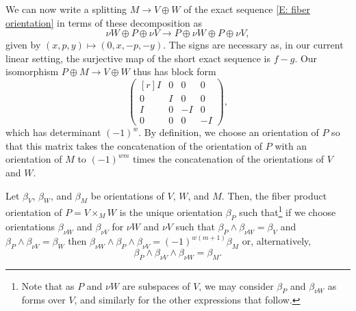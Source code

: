 We can now write a splitting $M \to V \oplus W$ of the exact sequence \eqref{E: fiber orientation} in terms of these decomposition as
$$\nu W \oplus P \oplus \nu V \to P \oplus \nu W \oplus P \oplus \nu V,$$
given by $(x,p,y) \mapsto (0, x, -p, -y)$.
The signs are necessary as, in our current linear setting, the surjective map of the short exact sequence is $f-g$.
Our isomorphism $P \oplus M \to V \oplus W$ thus has block form
$$\begin{pmatrix*}[r]
	I&0&0&0\\
	0&I&0&0\\
	I&0&-I&0\\
	0&0&0&-I
\end{pmatrix*},$$
which has determinant $(-1)^{w}$.
By definition, we choose an orientation of $P$ so that this matrix takes the concatenation of the orientation of $P$ with an orientation of $M$ to $(-1)^{wm}$ times the concatenation of the orientations of $V$ and $W$.

\begin{proposition}\label{P: orient intersection}
	Let $\beta_V$, $\beta_W$, and $\beta_M$ be orientations of $V$, $W$, and $M$.
	Then, the fiber product orientation of $P = V \times_M W$ is the unique orientation $\beta_P$ such that\footnote{Note that as $P$ and $\nu W$ are subspaces of $V$, we may consider $\beta_P$ and $\beta_{\nu W}$ as forms over $V$, and similarly for the other expressions that follow.} if we choose orientations $\beta_{\nu W}$ and $\beta_{\nu V}$ for $\nu W$ and $\nu V$ such that $\beta_P \wedge \beta_{\nu W} = \beta_V$ and $\beta_P \wedge \beta_{\nu V} = \beta_W$ then $\beta_{\nu W} \wedge \beta_P \wedge \beta_{\nu V} = (-1)^{w(m+1)}\beta_M$ or, alternatively, $$ \beta_P \wedge \beta_{\nu V} \wedge \beta_{\nu W} = \beta_M.$$
\end{proposition}

